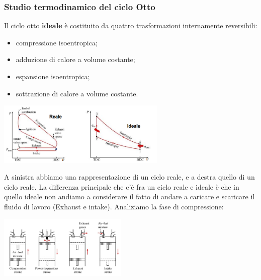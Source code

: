 \subsubsection{Studio termodinamico del ciclo Otto}
Il ciclo otto \textbf{ideale} è costituito da quattro trasformazioni internamente reversibili:
\begin{itemize}
    \item compressione isoentropica;
    \item adduzione di calore a volume costante;
    \item espansione isoentropica;
    \item sottrazione di calore a volume costante.
\end{itemize}
\begin{center}
    \includegraphics[height=3cm]{../L07/img11.PNG}
\end{center}
A sinistra abbiamo una rappresentazione di un ciclo reale, e a destra quello di un ciclo reale. La differenza principale che c'è fra un ciclo reale e ideale è che in quello ideale non andiamo a considerare il fatto di andare a caricare e scaricare il fluido di lavoro (Exhaust e intake).\newline
\newline
Analiziamo la fase di compressione:
\begin{center}
    \includegraphics[height=3cm]{../L07/img12.PNG}
\end{center}
